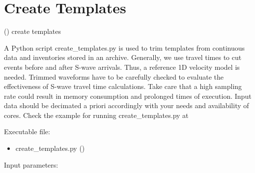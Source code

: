 \documentclass[a4paper,12pt,english]{sphinxmanual}
\begin{document}
\section{Create Templates}
\label{\detokenize{tutorial:create-templates}}
({\hyperref[\detokenize{sub/input.create_templates::doc}]{}}) create templates

A Python script create\_templates.py is used to trim templates from continuous data and inventories
stored in an archive. Generally, we use travel times to cut events before and after S-wave arrivals.
Thus, a reference 1D velocity model is needed. Trimmed waveforms have to be carefully checked to evaluate
the effectiveness of S-wave travel time calculations.
Take care that a high sampling rate could result in memory consumption
and prolonged times of execution.
Input data should be decimated a priori accordingly with your needs and availability of cores.
Check the example for running create\_templates.py at 

Executable file:
\begin{itemize}
\item {} 
create\_templates.py ()

\end{itemize}

Input parameters:

\begin{sphinxVerbatim}[commandchars=\\\{\}]
         
  
 
\end{sphinxVerbatim}
\end{document}
